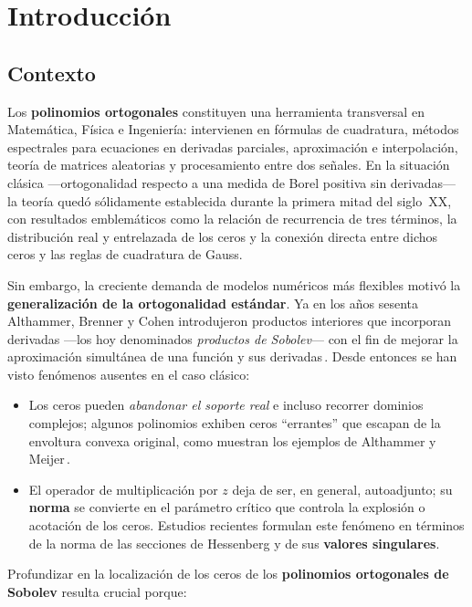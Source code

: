 \chapter{Introducción}
\label{ch:intro}

\section{Contexto}

Los \textbf{polinomios ortogonales} constituyen una herramienta transversal en Matemática, Física e Ingeniería: intervienen en fórmulas de cuadratura, métodos espectrales para ecuaciones en derivadas parciales, aproximación e interpolación, teoría de matrices aleatorias y procesamiento entre dos señales.
En la situación clásica —ortogonalidad respecto a una medida de Borel positiva sin derivadas— la teoría quedó sólidamente establecida durante la primera mitad del siglo~XX, con resultados emblemáticos como la relación de recurrencia de tres términos, la distribución real y entrelazada de los ceros y la conexión directa entre dichos ceros y las reglas de cuadratura de Gauss.

Sin embargo, la creciente demanda de modelos numéricos más flexibles motivó la \textbf{generalización de la ortogonalidad estándar}.  Ya en los años sesenta Althammer, Brenner y Cohen introdujeron productos interiores que incorporan derivadas —los hoy denominados \emph{productos de Sobolev}— con el fin de mejorar la aproximación simultánea de una función y sus derivadas\,\cite{Althammer1962,Brenner1972,Cohen1975}.
Desde entonces se han visto fenómenos ausentes en el caso clásico:

\begin{itemize}
  \item Los ceros pueden \emph{abandonar el soporte real} e incluso recorrer dominios complejos; algunos polinomios exhiben ceros ``errantes'' que escapan de la envoltura convexa original, como muestran los ejemplos de Althammer y Meijer\,\cite{Meijer1993,Meijer1994}.
  \item El operador de multiplicación por $z$ deja de ser, en general, autoadjunto; su \textbf{norma} se convierte en el parámetro crítico que controla la explosión o acotación de los ceros.  Estudios recientes formulan este fenómeno en términos de la norma de las secciones de Hessenberg y de sus \textbf{valores singulares}\cite{singularValuesOfHessenbergMatrices}.
\end{itemize}

Profundizar en la localización de los ceros de los \textbf{polinomios ortogonales de Sobolev} resulta crucial porque:

